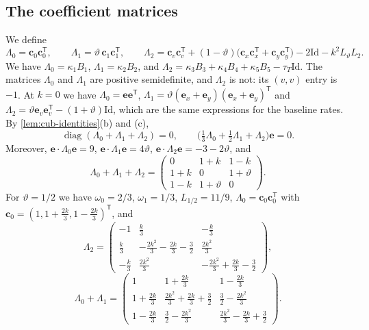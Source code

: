\subsection{The coefficient matrices}

We define
\begin{equation}\label{eq:cub-Lambda}
 \Lambda_0=\mathbf c_0\mathbf c_0^{\mathsf T},\qquad
 \Lambda_1=\vartheta\,\mathbf c_1\mathbf c_1^{\mathsf T},\qquad
 \Lambda_2=\mathbf c_v\mathbf c_v^{\mathsf T}
 +(1-\vartheta)\bigl(\mathbf c_x\mathbf c_x^{\mathsf T}+\mathbf c_y\mathbf c_y^{\mathsf T}\bigr)
 -2\mathrm{Id}-k^2L_\vartheta L_2.
\end{equation}
We have $\Lambda_0=\kappa_1B_1$, $\Lambda_1=\kappa_2B_2$, and
$\Lambda_2=\kappa_3B_3+\kappa_4B_4+\kappa_5B_5-\tau_T\mathrm{Id}$. The matrices
$\Lambda_0$ and $\Lambda_1$ are positive semidefinite, and $\Lambda_2$ is not:
its $(v,v)$ entry is $-1$. At $k=0$ we have $\Lambda_0=\mathbf e\mathbf
e^{\mathsf T}$, $\Lambda_1=\vartheta(\mathbf e_x+\mathbf e_y)(\mathbf e_x+\mathbf
e_y)^{\mathsf T}$ and $\Lambda_2=\vartheta\mathbf e_v\mathbf e_v^{\mathsf
T}-(1+\vartheta)\mathrm{Id}$, which are the same expressions for the baseline rates.
By \cref{lem:cub-identities}(b) and (c),
\begin{equation}\label{b:eq:os-matrix-cancellations}
 \operatorname{diag}(\Lambda_0+\Lambda_1+\Lambda_2)=0,\qquad
 \bigl(\tfrac13\Lambda_0+\tfrac12\Lambda_1+\Lambda_2\bigr)\mathbf e=0.
\end{equation}
Moreover, $\mathbf e\cdot\Lambda_0\mathbf e=9$,
$\mathbf e\cdot\Lambda_1\mathbf e=4\vartheta$,
$\mathbf e\cdot\Lambda_2\mathbf e=-3-2\vartheta$, and
\[
 \Lambda_0+\Lambda_1+\Lambda_2=\begin{pmatrix}0&1+k&1-k\\1+k&0&1+\vartheta\\
 1-k&1+\vartheta&0\end{pmatrix}.
\]
For $\vartheta=1/2$ we have $\omega_0=2/3$, $\omega_1=1/3$, $L_{1/2}=11/9$,
$\Lambda_0=\mathbf c_0\mathbf c_0^{\mathsf T}$ with
$\mathbf c_0=(1,1+\frac{2k}3,1-\frac{2k}3)^{\mathsf T}$, and
\[
 \Lambda_2=\begin{pmatrix}
 -1&\frac k3&-\frac k3\\[2pt]
 \frac k3&-\frac{2k^2}3-\frac{2k}3-\frac32&\frac{2k^2}3\\[2pt]
 -\frac k3&\frac{2k^2}3&-\frac{2k^2}3+\frac{2k}3-\frac32
 \end{pmatrix},
\]
\[
 \Lambda_0+\Lambda_1=\begin{pmatrix}
 1&1+\frac{2k}3&1-\frac{2k}3\\[2pt]
 1+\frac{2k}3&\frac{2k^2}3+\frac{2k}3+\frac32&\frac32-\frac{2k^2}3\\[2pt]
 1-\frac{2k}3&\frac32-\frac{2k^2}3&\frac{2k^2}3-\frac{2k}3+\frac32
 \end{pmatrix}.
\]

